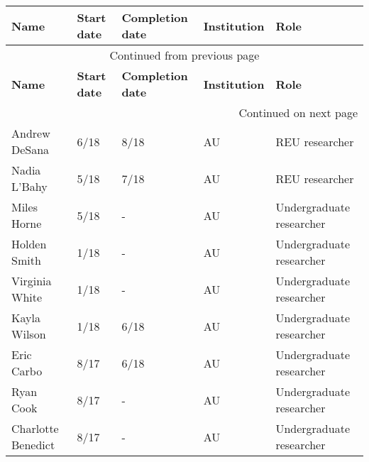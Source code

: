 {\sffamily\small
{}
\begin{longtable}[l]{ p{1.2in} p{0.5in} p{0.8in}p{0.75in} p{2in} }
    \hline
    \textbf{Name} & \textbf{Start date} & \textbf{Completion date} & \textbf{Institution} & \textbf{Role} \\
    \hline
    \endfirsthead
    \multicolumn{5}{c}{{Continued from previous page}} \\
    \hline
    \textbf{Name} & \textbf{Start date} & \textbf{Completion date} & \textbf{Institution} & \textbf{Role} \\
    \hline
    \endhead
    \hline \multicolumn{5}{r}{{Continued on next page}} \\
    \endfoot
    \hline
    \endlastfoot
    Andrew DeSana & 6/18 & 8/18 & AU & REU researcher \\
    Nadia L'Bahy & 5/18 & 7/18 & AU & REU researcher \\
    Miles Horne & 5/18 & - & AU & Undergraduate researcher \\
    Holden Smith & 1/18 & - & AU & Undergraduate researcher \\
    Virginia White & 1/18 & - & AU & Undergraduate researcher \\
    Kayla Wilson & 1/18 & 6/18 & AU & Undergraduate researcher \\
    Eric Carbo & 8/17 & 6/18 & AU & Undergraduate researcher \\
    Ryan Cook & 8/17 & - & AU & Undergraduate researcher \\
    Charlotte Benedict & 8/17 & - & AU & Undergraduate researcher \\
\end{longtable}
}
